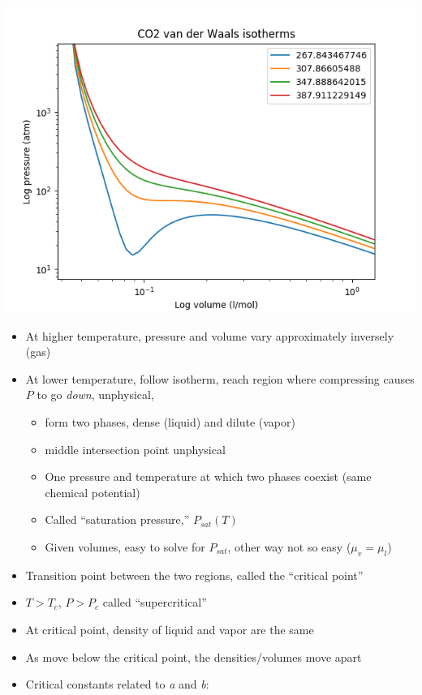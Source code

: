 \documentclass[11pt]{article}
\begin{document}
\includegraphics[width=.9\linewidth]{./figs/logvdWgas.png}

\begin{itemize}
\item At higher temperature, pressure and volume vary approximately inversely (gas)
\item At lower temperature, follow isotherm, reach region where compressing causes $P$ to go \emph{down}, unphysical,
\begin{itemize}
\item form two phases, dense (liquid) and dilute (vapor)
\item middle intersection point unphysical
\item One pressure and temperature at which two phases coexist (same chemical potential)
\item Called ``saturation pressure,'' \(P_{sat}(T)\)
\item Given volumes, easy to solve for \(P_{sat}\), other way not so easy (\(\mu_{v} = \mu_{l}\))
\end{itemize}

\item Transition point between the two regions, called the ``critical point''
\item \(T > T_{c}\), \(P>P_{c}\) called ``supercritical''
\item At critical point, density of liquid and vapor are the same
\item As move below the critical point, the densities/volumes move apart

\item Critical constants related to \emph{a} and \emph{b}:
\end{itemize}
\end{document}

